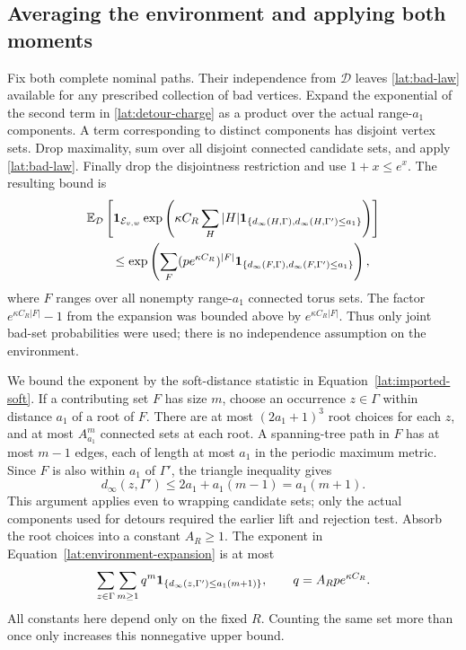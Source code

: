 \subsection{Averaging the environment and applying both moments}

Fix both complete nominal paths.  Their independence from $\mathcal D$
leaves \eqref{lat:bad-law} available for any prescribed collection of
bad vertices.  Expand the exponential of the second term in
\eqref{lat:detour-charge} as a product over the actual range-$a_1$
components.  A term corresponding to distinct components has disjoint
vertex sets.  Drop maximality, sum over all disjoint connected candidate
sets, and apply \eqref{lat:bad-law}.  Finally drop the disjointness
restriction and use $1+x\le e^x$.  The resulting bound is
\begin{align}\label{lat:environment-expansion}
 &\mathbb E_{\mathcal D}\left[
 \mathbf 1_{\mathcal E_{v,w}}
 \exp\left(\kappa C_R\sum_H|H|
   \mathbf 1_{\{d_\infty(H,\Gamma),d_\infty(H,\Gamma')\le a_1\}}\right)
                       \right]\notag\\
 &\qquad\le
 \exp\left(\sum_F
       (p e^{\kappa C_R})^{|F|}
       \mathbf 1_{\{d_\infty(F,\Gamma),d_\infty(F,\Gamma')\le a_1\}}
                         \right),
\end{align}
where $F$ ranges over all nonempty range-$a_1$ connected torus sets.
The factor $e^{\kappa C_R|F|}-1$ from the expansion was bounded above
by $e^{\kappa C_R|F|}$.  Thus only joint bad-set probabilities were
used; there is no independence assumption on the environment.

We bound the exponent by the soft-distance statistic in
Equation~\eqref{lat:imported-soft}. If a contributing set $F$ has size $m$,
choose an occurrence $z\in\Gamma$ within distance $a_1$ of a root of $F$.
There are at most $(2a_1+1)^3$ root choices for each $z$, and at most
$A_{a_1}^m$ connected sets at each root. A spanning-tree path in $F$ has
at most $m-1$ edges, each of length at most $a_1$ in the periodic maximum
metric. Since $F$ is also within $a_1$ of $\Gamma'$, the triangle inequality
gives
\[
 d_\infty(z,\Gamma')\le 2a_1+a_1(m-1)=a_1(m+1).
\]
This argument applies even to wrapping candidate sets; only the actual
components used for detours required the earlier lift and rejection test.
Absorb the root choices into a constant $A_R\ge1$. The exponent in
Equation~\eqref{lat:environment-expansion} is at most
\begin{equation}\label{lat:animal-series}
 \sum_{z\in\Gamma}\sum_{m\ge1}q^m
       \mathbf 1_{\{d_\infty(z,\Gamma')\le a_1(m+1)\}},
 \qquad q=A_Rp e^{\kappa C_R}.
\end{equation}
All constants here depend only on the fixed $R$. Counting the same set
more than once only increases this nonnegative upper bound.

